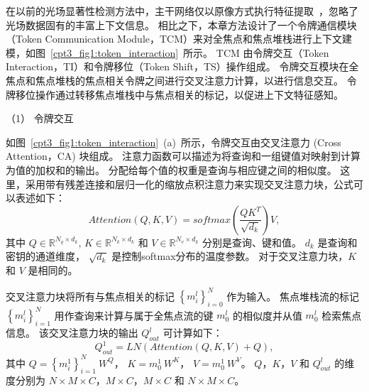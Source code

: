 在以前的光场显著性检测方法中，主干网络仅以原像方式执行特征提取~\cite{piao2020exploit, liu2021light}，忽略了光场数据固有的丰富上下文信息。 相比之下，本章方法设计了一个令牌通信模块（Token Communication Module，TCM）来对全焦点和焦点堆栈进行上下文建模，如图~\ref{cpt3_fig1:token_interaction}~所示。
TCM 由令牌交互（Token Interaction，TI）和令牌移位（Token Shift，TS）操作组成。 
令牌交互模块在全焦点和焦点堆栈的焦点相关令牌之间进行交叉注意力计算，以进行信息交互。 
令牌移位操作通过转移焦点堆栈中与焦点相关的标记，以促进上下文特征感知。 








（1）
令牌交互


如图~\ref{cpt3_fig1:token_interaction}~(a)~所示，令牌交互由交叉注意力 (Cross Attention，CA) 块组成。 
注意力函数可以描述为将查询和一组键值对映射到计算为值的加权和的输出。 
分配给每个值的权重是查询与相应键之间的相似度。 
这里，采用带有残差连接和层归一化的缩放点积注意力来实现交叉注意力块，公式可以表述如下：
%
%
%
\begin{equation}
	Attention(Q,K,V) = softmax \left ( \frac{QK^{T}}{\sqrt{d_{k}}} \right ) V,
\end{equation}
%
%
其中
$ Q \in \mathbb{R}^{N_{q}\times d_{k}}  $,
$ K \in \mathbb{R}^{N_{k}\times d_{k}}  $ 和
$ V \in \mathbb{R}^{N_{v}\times d_{k}}  $ 
分别是查询、键和值。 
$ d_{k} $ 是查询和密钥的通道维度，
$ \sqrt{d_{k}} $ 是控制softmax分布的温度参数。 
对于交叉注意力块，$K$ 和 $V$ 是相同的。 
%
%
%
%
%
\par
%
%
%
%
交叉注意力块将所有与焦点相关的标记 $ \left \{ m_{i}^{l} \right \}_{i=0}^{N} $ 作为输入。 焦点堆栈流的标记 $ \left \{  m_{i}^{l} \right \}_{i=1}^{N} $ 用作查询来计算与属于全焦点流的键 $ m_{0}^{l} $ 的相似度并从值 $ m_{0}^{l} $ 检索焦点信息。 该交叉注意力块的输出 $ Q_{out}^{l} $ 可计算如下：
%
%
\begin{equation}
	Q_{out}^{1} = LN \left ( Attention(Q,K,V) + Q \right ),
\end{equation}
%
%
其中
$ Q = \left \{ m_{i}^{1} \right \}_{i=1}^{N}~ W^{Q}$，
$ K= m_{0}^{1} ~W^{K} $，
$ V =  m_{0}^{1}~ W^{V} $。
$ Q$，$K$，$V$ 和 $ Q_{out}^{l} $
的维度分别为 
$ N \times M \times C $，$ M \times C $，$ M \times C $ 
和
 $ N \times M \times C $。 


















